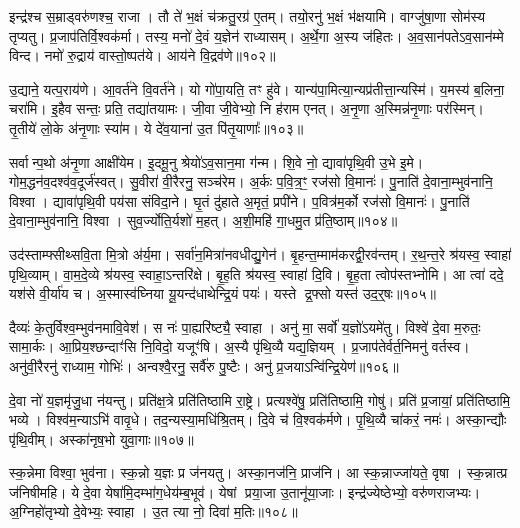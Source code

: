 इन्द्र॑श्च स॒म्राड्वरु॑णश्च॒ राजा।
तौ ते॑ भ॒क्षं च॑क्रतु॒रग्र॑ ए॒तम्।
तयो॒रनु॑ भ॒क्षं भ॑क्षयामि।
वाग्जु॑षा॒णा सोम॑स्य तृप्यतु।
प्र॒जाप॑तिर्वि॒श्वक॑र्मा।
तस्य॒ मनो॑ दे॒वं य॒ज्ञेन॑ राध्यासम्।
अ॒र्थे॒गा अ॒स्य ज॑हितः।
अ॒व॒सान॑पते\-ऽव॒सान॑म्मे विन्द।
नमो॑ रु॒द्राय॑ वास्तो॒ष्पत॑ये।
आय॑ने वि॒द्रव॑णे॥१०२॥

उ॒द्याने॒ यत्प॒राय॑णे।
आ॒वर्त॑ने वि॒वर्त॑ने।
यो गो॑पा॒यति॒ तꣳ हु॑वे।
यान्य॑पा॒मित्या॒न्यप्र॑तीत्ता॒न्यस्मि॑।
य॒मस्य॑ ब॒लिना॒ चरा॑मि।
इ॒हैव सन्तः॒ प्रति॒ तद्या॑तयामः।
जी॒वा जी॒वेभ्यो॒ नि ह॑राम एनत्।
अ॒नृ॒णा अ॒स्मिन्न॑नृ॒णाः पर॑स्मिन्।
तृ॒तीये॑ लो॒के अ॑नृ॒णाः स्या॑म।
ये दे॑व॒याना॑ उ॒त पि॑तृ॒याणाः᳚॥१०३॥

सर्वान्प॒थो अ॑नृ॒णा आक्षी॑येम।
इ॒दमू॒नु श्रेयो॑\-ऽव॒सान॒मा ग॑न्म।
शि॒वे नो॒ द्यावा॑पृथि॒वी उ॒भे इ॒मे।
गोम॒द्धन॑व॒दश्व॑व॒दूर्ज॑स्वत्।
सु॒वीरा॑ वी॒रैरनु॒ सञ्च॑रेम।
अ॒र्कः प॒वि॒त्र॒ꣳ॒ रज॑सो वि॒मानः॑।
पु॒नाति॑ दे॒वाना॒म्भुव॑नानि॒ विश्वा।
द्यावा॑पृथि॒वी पय॑सा संविदा॒ने।
घृ॒तं दु॑हाते अ॒मृतं॒ प्रपी॑ने।
प॒वित्र॑म॒र्को रज॑सो वि॒मानः॑।
पु॒नाति॑ दे॒वाना॒म्भुव॑नानि॒ विश्वा।
सुव॒र्ज्योति॒र्यशो॑ म॒हत्।
अ॒शी॒महि॑ गा॒धमु॒त प्र॑ति॒ष्ठाम्॥१०४॥\anuvakamend[चा॒त॒य॒त॒ श्री॒णी॒ता॒ꣳ॒ स॒त्यमा॒हुर॑शीमहि ग॒णे कु॑रु वि॒द्रव॑णे पितृ॒याणा॑ अ॒र्को रज॑सो वि॒मान॒स्त्रीणि॑ च]

उद॑स्ताम्फ्सीथ्सवि॒ता मि॒त्रो अ॑र्य॒मा।
सर्वा॑न॒मित्रा॑नवधीद्यु॒गेन॑।
बृ॒हन्त॒म्माम॑करद्वी॒रव॑न्तम्।
र॒थ॒न्त॒रे श्र॑यस्व॒ स्वाहा॑ पृथि॒व्याम्।
वा॒म॒दे॒व्ये श्र॑यस्व॒ स्वाहा॒\-ऽन्तरि॑क्षे।
बृ॒ह॒ति श्र॑यस्व॒ स्वाहा॑ दि॒वि।
बृ॒ह॒ता त्वोप॑स्तभ्नोमि।
आ त्वा॑ ददे॒ यश॑से वी॒र्या॑य च।
अ॒स्मास्व॑घ्निया यू॒यन्द॑धाथेन्द्रि॒यं पयः॑।
यस्ते द्र॒फ्सो यस्त॑ उद॒र्॒षः॥१०५॥

दैव्यः॑ के॒तुर्विश्व॒म्भुव॑नमावि॒वेश॑।
स नः॑ पा॒ह्यरि॑ष्ट्यै॒ स्वाहा।
अनु॑ मा॒ सर्वो॑ य॒ज्ञो॑\-ऽयमे॑तु।
विश्वे॑ दे॒वा म॒रुतः॒ सामा॒र्कः।
आ॒प्रिय॒श्छन्दाꣳ॑सि नि॒विदो॒ यजूꣳ॑षि।
अ॒स्यै पृ॑थि॒व्यै यद्य॒ज्ञियम्।
प्र॒जाप॑तेर्वर्त॒निमनु॑ वर्तस्व।
अनु॑वी॒रैरनु॑ राध्याम॒ गोभिः॑।
अन्वश्वै॒रनु॒ सर्वै॑रु पु॒ष्टैः।
अनु॑ प्र॒जया\-ऽन्वि॑न्द्रि॒येण॑॥१०६॥

दे॒वा नो॑ य॒ज्ञमृ॑जु॒धा न॑यन्तु।
प्रति॑क्ष॒त्रे प्रति॑तिष्ठामि रा॒ष्ट्रे।
प्रत्यश्वे॑षु॒ प्रति॑तिष्ठामि॒ गोषु॑।
प्रति॑ प्र॒जायां॒ प्रति॑तिष्ठामि॒ भव्ये।
विश्व॑म॒न्याऽभि॑ वावृ॒धे।
तद॒न्यस्या॒मधि॑श्रि॒तम्।
दि॒वे च॑ वि॒श्वक॑र्मणे।
पृ॒थि॒व्यै चा॑करं॒ नमः॑।
अस्का॒न्द्यौः पृ॑थि॒वीम्।
अस्का॑नृष॒भो युवा॒गाः॥१०७॥

स्क॒न्नेमा विश्वा॒ भुव॑ना।
स्क॒न्नो य॒ज्ञः प्र ज॑नयतु।
अस्का॒नज॑नि॒ प्राज॑नि।
आ स्क॒न्नाज्जा॑यते॒ वृषा।
स्क॒न्नात्प्र ज॑निषीमहि।
ये दे॒वा येषा॑मि॒दम्भा॑ग॒धेय॑म्ब॒भूव॑।
येषां प्रया॒जा उ॒तानू॑या॒जाः।
इन्द्र॑ज्येष्ठेभ्यो॒ वरु॑णराजभ्यः।
अ॒ग्निहो॑तृभ्यो दे॒वेभ्यः॒ स्वाहा।
उ॒त त्या नो॒ दिवा॑ म॒तिः॥१०८॥


